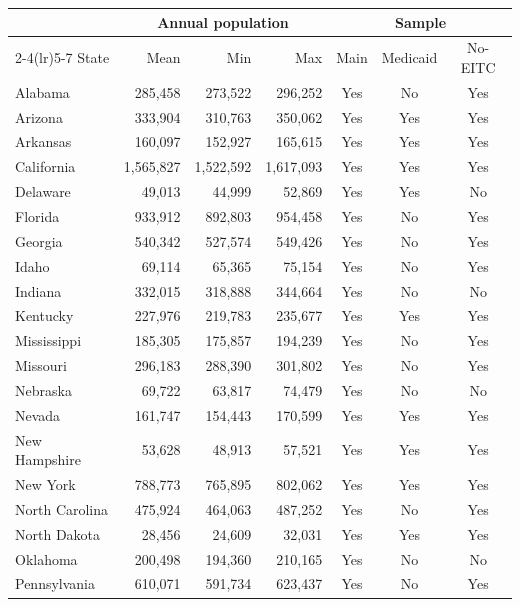 \begin{tabular}{lrrrccc}
\hline\hline
 & \multicolumn{3}{c}{Annual population} & \multicolumn{3}{c}{Sample} \\
\cmidrule(lr){2-4}\cmidrule(lr){5-7}
State & Mean & Min & Max & Main & Medicaid & No-EITC \\
\hline
Alabama                &   285,458 &   273,522 &   296,252 & Yes & No & Yes \\
Arizona                &   333,904 &   310,763 &   350,062 & Yes & Yes & Yes \\
Arkansas               &   160,097 &   152,927 &   165,615 & Yes & Yes & Yes \\
California             & 1,565,827 & 1,522,592 & 1,617,093 & Yes & Yes & Yes \\
Delaware               &    49,013 &    44,999 &    52,869 & Yes & Yes & No \\
Florida                &   933,912 &   892,803 &   954,458 & Yes & No & Yes \\
Georgia                &   540,342 &   527,574 &   549,426 & Yes & No & Yes \\
Idaho                  &    69,114 &    65,365 &    75,154 & Yes & No & Yes \\
Indiana                &   332,015 &   318,888 &   344,664 & Yes & No & No \\
Kentucky               &   227,976 &   219,783 &   235,677 & Yes & Yes & Yes \\
Mississippi            &   185,305 &   175,857 &   194,239 & Yes & No & Yes \\
Missouri               &   296,183 &   288,390 &   301,802 & Yes & No & Yes \\
Nebraska               &    69,722 &    63,817 &    74,479 & Yes & No & No \\
Nevada                 &   161,747 &   154,443 &   170,599 & Yes & Yes & Yes \\
New Hampshire          &    53,628 &    48,913 &    57,521 & Yes & Yes & Yes \\
New York               &   788,773 &   765,895 &   802,062 & Yes & Yes & Yes \\
North Carolina         &   475,924 &   464,063 &   487,252 & Yes & No & Yes \\
North Dakota           &    28,456 &    24,609 &    32,031 & Yes & Yes & Yes \\
Oklahoma               &   200,498 &   194,360 &   210,165 & Yes & No & No \\
Pennsylvania           &   610,071 &   591,734 &   623,437 & Yes & No & Yes \\

\end{tabular}
